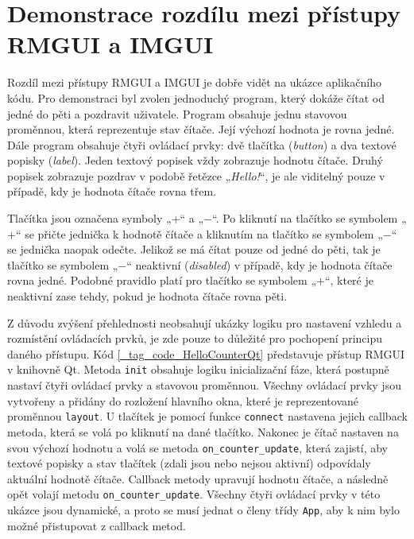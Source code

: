 \documentclass[FM,DP]{tulthesis}
\begin{document}
	\section{Demonstrace rozdílu mezi přístupy RMGUI a IMGUI}\label{Chapter2SectionHelloCounter}
	
	Rozdíl mezi přístupy RMGUI a IMGUI je dobře vidět na ukázce aplikačního kódu. Pro demonstraci byl zvolen jednoduchý program, který dokáže čítat od jedné do pěti a pozdravit uživatele. Program obsahuje jednu stavovou proměnnou, která reprezentuje stav čítače. Její výchozí hodnota je rovna jedné. Dále program obsahuje čtyři ovládací prvky: dvě tlačítka (\textit{button}) a dva textové popisky (\textit{label}). Jeden textový popisek vždy zobrazuje hodnotu čítače. Druhý popisek zobrazuje pozdrav v podobě řetězce „\textit{Hello!}“, je ale viditelný pouze v případě, kdy je hodnota čítače rovna třem.
	
	Tlačítka jsou označena symboly „$+$“ a „$-$“. Po kliknutí na tlačítko se symbolem „$+$“ se přičte jednička k hodnotě čítače a kliknutím na tlačítko se symbolem „$-$“ se jednička naopak odečte. Jelikož se má čítat pouze od jedné do pěti, tak je tlačítko se symbolem „$-$“ neaktivní (\textit{disabled}) v případě, kdy je hodnota čítače rovna jedné. Podobné pravidlo platí pro tlačítko se symbolem „$+$“, které je neaktivní zase tehdy, pokud je hodnota čítače rovna pěti.
	
	Z důvodu zvýšení přehlednosti neobsahují ukázky logiku pro nastavení vzhledu a rozmístění ovládacích prvků, je zde pouze to důležité pro pochopení principu daného přístupu. Kód \ref{_tag_code_HelloCounterQt} představuje přístup RMGUI v knihovně Qt. Metoda \texttt{init} obsahuje logiku inicializační fáze, která postupně nastaví čtyři ovládací prvky a stavovou proměnnou. Všechny ovládací prvky jsou vytvořeny a přidány do rozložení hlavního okna, které je reprezentované proměnnou \texttt{layout}. U tlačítek je pomocí funkce \texttt{connect} nastavena jejich callback metoda, která se volá po kliknutí na dané tlačítko. Nakonec je čítač nastaven na svou výchozí hodnotu a volá se metoda \texttt{on\_counter\_update}, která zajistí, aby textové popisky a stav tlačítek (zdali jsou nebo nejsou aktivní) odpovídaly aktuální hodnotě čítače. Callback metody upravují hodnotu čítače, a následně opět volají metodu \texttt{on\_counter\_update}. Všechny čtyři ovládací prvky v této ukázce jsou dynamické, a proto se musí jednat o členy třídy \texttt{App}, aby k nim bylo možné přistupovat z callback metod.
	
\end{document}
